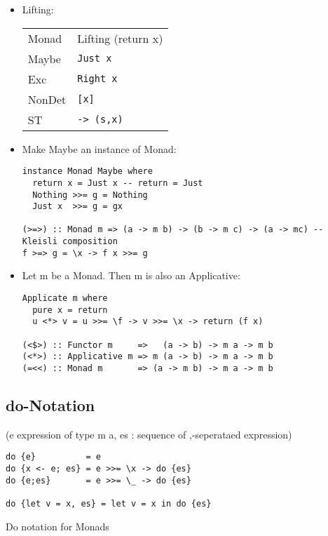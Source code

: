 \documentclass{article}
\newcommand{\Haskell}[1]{\texttt{#1}}
\begin{document}
\begin{itemize}
\item Lifting: \begin{tabular}{l|l}
Monad & Lifting (return x)\\
Maybe & \Haskell{Just x}\\
Exc   & \Haskell{Right x}\\
NonDet& \Haskell{[x]}\\
ST    & \Haskell{\s -> (s,x)}
\end{tabular}
\item Make Maybe an instance of Monad:
\begin{verbatim}
instance Monad Maybe where
  return x = Just x -- return = Just
  Nothing >>= g = Nothing
  Just x  >>= g = gx

(>=>) :: Monad m => (a -> m b) -> (b -> m c) -> (a -> mc) -- Kleisli composition
f >=> g = \x -> f x >>= g
\end{verbatim}
\item Let m be a Monad. Then m is also an Applicative:
\begin{verbatim}
Applicate m where 
  pure x = return
  u <*> v = u >>= \f -> v >>= \x -> return (f x)

(<$>) :: Functor m     =>   (a -> b) -> m a -> m b
(<*>) :: Applicative m => m (a -> b) -> m a -> m b
(=<<) :: Monad m       => (a -> m b) -> m a -> m b
\end{verbatim}
\end{itemize}
\clearpage
\subsection{do-Notation}
(e expression of type m a, es : sequence of ,-seperataed expression)
\begin{verbatim}
do {e}          = e
do {x <- e; es} = e >>= \x -> do {es}
do {e;es}       = e >>= \_ -> do {es}

do {let v = x, es} = let v = x in do {es}
\end{verbatim}
\begin{listing}
\caption{Do notation for Monads}
\inputminted[]{Haskell}{monadic-ST.hs}
\end{listing}
\end{document}
